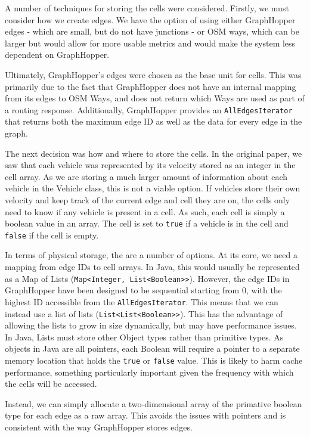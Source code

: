 \documentclass[ %
                    author={Alexander Hill},
                supervisor={Dr. Benjamin Sach},
                    degree={MEng},
                     title={MARMOSET},
                  subtitle={Multi-Agent Route Management using Online Simulation for Efficient Transportation},
                      type={research},
                      year={2016} ]{dissertation}
\begin{document}
A number of techniques for storing the cells were considered. Firstly, we must
consider how we create edges. We have the option of using either GraphHopper
edges - which are small, but do not have junctions - or OSM ways, which can be
larger but would allow for more usable metrics and would make the system less
dependent on GraphHopper.

Ultimately, GraphHopper's edges were chosen as the base unit for cells. This was
primarily due to the fact that GraphHopper does not have an internal mapping
from its edges to OSM Ways, and does not return which Ways are used as part of a
routing response. Additionally, GraphHopper provides an
\texttt{AllEdgesIterator} that returns both the maximum edge ID as well as the
data for every edge in the graph.

The next decision was how and where to store the cells. In the original paper, we
saw that each vehicle was represented by its velocity stored as an integer in
the cell array. As we are storing a much larger amount of information about each
vehicle in the Vehicle class, this is not a viable option. If vehicles store
their own velocity and keep track of the current edge and cell they are on, the
cells only need to know if any vehicle is present in a cell. As such, each cell
is simply a boolean value in an array. The cell is set to \texttt{true} if a
vehicle is in the cell and \texttt{false} if the cell is empty.

In terms of physical storage, the are a number of options. At its core, we need
a mapping from edge IDs to cell arrays. In Java, this would usually be
represented as a Map of Lists (\texttt{Map<Integer, List<Boolean>{}>}). However,
the edge IDs in GraphHopper have been designed to be sequential starting from 0,
with the highest ID accessible from the \texttt{AllEdgesIterator}. This means
that we can instead use a list of lists (\texttt{List<List<Boolean>{}>}). This has
the advantage of allowing the lists to grow in size dynamically, but may have
performance issues. In Java, Lists must store other Object types rather than
primitive types. As objects in Java are all pointers, each Boolean will require
a pointer to a separate memory location that holds the \texttt{true} or
\texttt{false} value.  This is likely to harm cache performance, something
particularly important given the frequency with which the cells will be
accessed.

Instead, we can simply allocate a two-dimensional array of the primative boolean
type for each edge as a raw array. This avoids the issues with pointers and is
consistent with the way GraphHopper stores edges.
\end{document}
